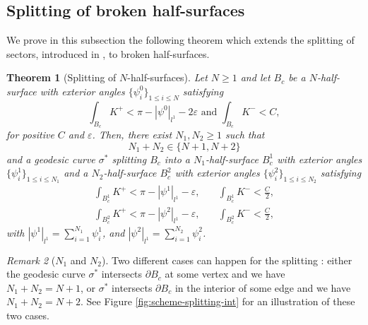 \documentclass{article}
\newcommand{\halfP}{B}
\newtheorem{theorem}{Theorem}
\theoremstyle{remark}
\newtheorem{remarkE}[theorem]{Remark}
\theoremstyle{prpart}
\begin{document}
\subsection{Splitting of broken half-surfaces}\label{subsubsec:split-half-surfaces}
We prove in this subsection the following theorem which extends the splitting of sectors, introduced in \cite{Bur05}, to broken half-surfaces.
\begin{theorem}[Splitting of $N$-half-surfaces]\label{thm:split}
  Let $N\geq 1$ and let $\halfP_c$ be a $N$-half-surface with exterior angles $\{\psi_i^0\}_{1\leq i\leq N}$ satisfying
\begin{equation} \label{eq:hyp-thm-split}
  \int_{\halfP_c} K^+<\pi-|\psi^0|_{l^1}-2\varepsilon \text{ and } \int_{\halfP_c}K^-<C,
\end{equation}
for positive $C$ and $\varepsilon$. Then, there exist $N_1,N_2\geq 1$ such that 
\begin{equation}\label{eq:nb-vertex}
N_1+N_2\in\{N+1,N+2\}
\end{equation}
and a geodesic curve $\sigma^\ast$ splitting $\halfP_c$ into a $N_1$-half-surface $\halfP_c^1$ with exterior angles $\{\psi_i^1\}_{1\leq i\leq N_1}$ and a $N_2$-half-surface $\halfP_c^2$ with exterior angles $\{\psi_i^2\}_{1\leq i\leq N_2}$ satisfying
\begin{subequations}\label{eq:split}
\begin{alignat}{2}\label{eq:split1}
\int_{\halfP_c^1} K^+ < \pi-|\psi^1|_{l^1}-\varepsilon, &\quad
\int_{\halfP_c^1} K^- < \frac{C}{2}, \\
\int_{\halfP_c^2} K^+ < \pi-|\psi^2|_{l^1}-\varepsilon, &\quad
\int_{\halfP_c^2} K^- < \frac{C}{2},\label{eq:split2}
\end{alignat}
\end{subequations}
with $\displaystyle|\psi^1|_{l^1} = \sum_{i=1}^{N_1}\psi^1_i$, and $\displaystyle|\psi^2|_{l^1} = \sum_{i=1}^{N_2}\psi^2_i$.
\end{theorem}

\begin{remarkE}[$N_1$ and $N_2$]\label{rem:cases-splitting}
Two different cases can happen for the splitting : either the geodesic curve $\sigma^\ast$ intersects $\partial\halfP_c$ at some vertex and we have $N_1+N_2=N+1$, or $\sigma^\ast$ intersects $\partial\halfP_c$ in the interior of some edge and we have $N_1+N_2 = N+2$. See Figure \ref{fig:scheme-splitting-int} for an illustration of these two cases.
\end{remarkE}
\end{document}
